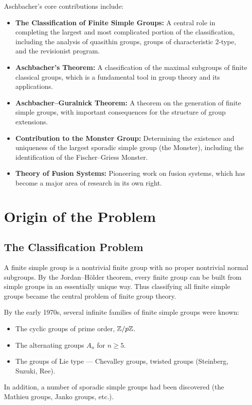 Aschbacher's core contributions include:
\begin{itemize}
    \item \textbf{The Classification of Finite Simple Groups:} A central role in completing the largest and most complicated portion of the classification, including the analysis of quasithin groups, groups of characteristic 2-type, and the revisionist program.
    \item \textbf{Aschbacher's Theorem:} A classification of the maximal subgroups of finite classical groups, which is a fundamental tool in group theory and its applications.
    \item \textbf{Aschbacher--Guralnick Theorem:} A theorem on the generation of finite simple groups, with important consequences for the structure of group extensions.
    \item \textbf{Contribution to the Monster Group:} Determining the existence and uniqueness of the largest sporadic simple group (the Monster), including the identification of the Fischer--Griess Monster.
    \item \textbf{Theory of Fusion Systems:} Pioneering work on fusion systems, which has become a major area of research in its own right.
\end{itemize}

\section{Origin of the Problem}

\subsection{The Classification Problem}

A finite simple group is a nontrivial finite group with no proper nontrivial normal subgroups. By the Jordan--H\"older theorem, every finite group can be built from simple groups in an essentially unique way. Thus classifying all finite simple groups became the central problem of finite group theory.

By the early 1970s, several infinite families of finite simple groups were known:
\begin{itemize}
    \item The cyclic groups of prime order, $\mathbb{Z}/p\mathbb{Z}$.
    \item The alternating groups $A_n$ for $n \geq 5$.
    \item The groups of Lie type --- Chevalley groups, twisted groups (Steinberg, Suzuki, Ree).
\end{itemize}
In addition, a number of sporadic simple groups had been discovered (the Mathieu groups, Janko groups, etc.).

